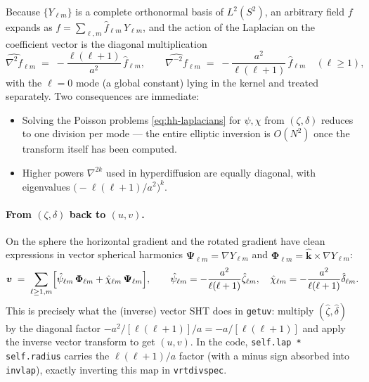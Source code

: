 \documentclass[11pt]{article}
\newcommand{\bvec}[1]{\boldsymbol{#1}}
\begin{document}
Because $\{Y_{\ell m}\}$ is a complete orthonormal basis of
$L^{2}(S^{2})$, an arbitrary field $f$ expands as
$f = \sum_{\ell,m} \hat f_{\ell m}\,Y_{\ell m}$, and the action of the
Laplacian on the coefficient vector is the diagonal multiplication
\begin{equation}
    \widehat{\nabla^{2} f}_{\ell m}
        \;=\; -\frac{\ell(\ell+1)}{a^{2}}\,\hat f_{\ell m},
    \qquad
    \widehat{\nabla^{-2} f}_{\ell m}
        \;=\; -\frac{a^{2}}{\ell(\ell+1)}\,\hat f_{\ell m}
        \quad(\ell\ge 1),
    \label{eq:lap-diag}
\end{equation}
with the $\ell=0$ mode (a global constant) lying in the kernel and
treated separately.  Two consequences are immediate:
\begin{itemize}
    \item Solving the Poisson problems \eqref{eq:hh-laplacians} for
          $\psi,\chi$ from $(\zeta,\delta)$ reduces to one division per
          mode --- the entire elliptic inversion is $O(N^{2})$ once
          the transform itself has been computed.
    \item Higher powers $\nabla^{2k}$ used in hyperdiffusion are equally
          diagonal, with eigenvalues
          $\bigl(-\ell(\ell+1)/a^{2}\bigr)^{k}$.
\end{itemize}

\paragraph{From $(\zeta,\delta)$ back to $(u,v)$.}
On the sphere the horizontal gradient and the rotated gradient have
clean expressions in vector spherical harmonics
$\bvec{\Psi}_{\ell m}=\nabla Y_{\ell m}$ and
$\bvec{\Phi}_{\ell m}=\hat{\bvec{k}}\times\nabla Y_{\ell m}$:
\begin{equation}
    \bvec{v}
        \;=\; \sum_{\ell\ge1,m}\Bigl[
            \hat\psi_{\ell m}\,\bvec{\Phi}_{\ell m}
            + \hat\chi_{\ell m}\,\bvec{\Psi}_{\ell m}\Bigr],
        \qquad
    \hat\psi_{\ell m} = -\frac{a^{2}}{\ell(\ell+1)}\hat\zeta_{\ell m},
    \quad
    \hat\chi_{\ell m} = -\frac{a^{2}}{\ell(\ell+1)}\hat\delta_{\ell m}.
\end{equation}
This is precisely what the (inverse) vector SHT does in
\texttt{getuv}: multiply $(\hat\zeta,\hat\delta)$ by the diagonal
factor $-a^{2}/[\ell(\ell+1)]/a = -a/[\ell(\ell+1)]$ and apply the
inverse vector transform to get $(u,v)$.  In the code,
\texttt{self.lap * self.radius} carries the $\ell(\ell+1)/a$ factor
(with a minus sign absorbed into \texttt{invlap}), exactly inverting
this map in \texttt{vrtdivspec}.
\end{document}
